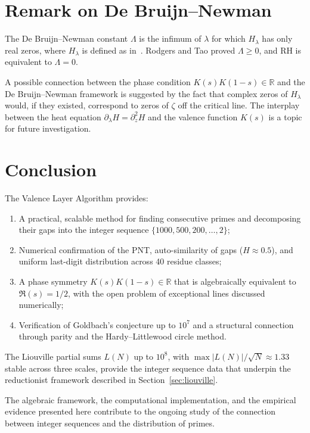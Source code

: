 \documentclass[12pt,a4paper]{article}
\theoremstyle{plain}
\begin{document}
\section{Remark on De Bruijn--Newman}
\label{sec:dbn}

The De Bruijn--Newman constant $\Lambda$ is the infimum of $\lambda$
for which $H_\lambda$ has only real zeros, where $H_\lambda$ is
defined as in~\cite{rodgers-tao}.  Rodgers and Tao proved
$\Lambda\ge0$, and RH is equivalent to $\Lambda=0$.

A possible connection between the phase condition
$K(s)K(1-s)\in\mathbb{R}$ and the De Bruijn--Newman framework is
suggested by the fact that complex zeros of $H_\lambda$ would, if
they existed, correspond to zeros of $\zeta$ off the critical line.
The interplay between the heat equation $\partial_\lambda H =
\partial_z^2 H$ and the valence function $K(s)$ is a topic for
future investigation.

\section{Conclusion}
\label{sec:conc}

The Valence Layer Algorithm provides:
\begin{enumerate}
  \item A practical, scalable method for finding consecutive primes
    and decomposing their gaps into the integer sequence
    $\{1000,500,200,\dots,2\}$;
  \item Numerical confirmation of the PNT, auto-similarity of gaps
    ($H\approx0.5$), and uniform last-digit distribution across
    40 residue classes;
  \item A phase symmetry $K(s)K(1-s)\in\mathbb{R}$ that is
    algebraically equivalent to $\Re(s)=1/2$, with the open
    problem of exceptional lines discussed numerically;
  \item Verification of Goldbach's conjecture up to $10^7$ and
    a structural connection through parity and the Hardy--Littlewood
    circle method.
\end{enumerate}

The Liouville partial sums $L(N)$ up to $10^{8}$,
with $\max|L(N)|/\sqrt{N}\approx1.33$ stable across three scales,
provide the integer sequence data that underpin the reductionist
framework described in Section~\ref{sec:liouville}.

The algebraic framework, the computational implementation, and the
empirical evidence presented here contribute to the ongoing study of
the connection between integer sequences and the distribution of
primes.
\end{document}
